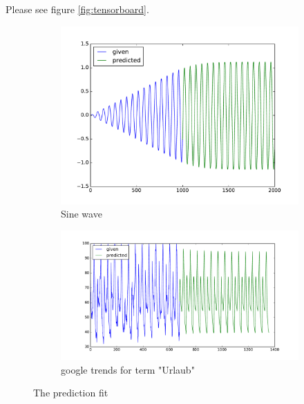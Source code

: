 \documentclass{article}
\begin{document}
\begin{enumerate}
\begin{enumerate}
		
		
		\begin{item}
			Please see  figure \ref{fig:tensorboard}. 

		\end{item}
		
		
	\end{enumerate}




		\begin{figure}[t]
			\centering
			\begin{subfigure}[b]{0.45\textwidth}
				\includegraphics[width=1\textwidth]{figures/sine}
				\caption{Sine wave}
				\label{fig:sine}
			\end{subfigure}	
			\quad
			\begin{subfigure}[b]{0.45\textwidth}
				\includegraphics[width=1\textwidth]{figures/urlaub}
				\caption{google trends for term "Urlaub"}
				\label{fig:urlaub}
			\end{subfigure}	
			\caption{The prediction fit}
		\end{figure}



\end{enumerate}
\end{document}
